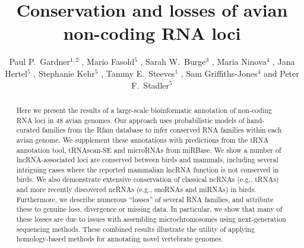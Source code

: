 \documentclass[10pt]{bmc_article}
\newenvironment{bmcformat}{\begin{raggedright}\baselineskip20pt\sloppy\setboolean{publ}{false}}{\end{raggedright}\baselineskip20pt\sloppy}
\begin{document}
\begin{bmcformat}

\title{Conservation and losses of avian non-coding RNA loci}

\author{
Paul P.\ Gardner\correspondingauthor$^{1,2}$
,
Mario Fasold$^5$
,
Sarah W.\ Burge$^3$
,
Maria Ninova$^4$
,
Jana Hertel$^5$
,
Stephanie Kehr$^5$
,
Tammy E.\ Steeves$^1$
,
Sam Griffiths-Jones$^4$
and
Peter F.\ Stadler\correspondingauthor$^5$
}
\address{
\iid(1) School of Biological Sciences, University of Canterbury, Private Bag 4800, Christchurch, New Zealand.
\iid(2) Biomolecular Interaction Centre, University of Canterbury, Private Bag 4800, Christchurch, New Zealand.
\iid(3) European Molecular Biology Laboratory, European Bioinformatics Institute, Hinxton, Cambridge, CB10 1SD, UK.
\iid(4) Faculty of Life Sciences, University of Manchester, Manchester, United Kingdom.
\iid(5) Bioinformatics Group, Department of Computer Science; and Interdisciplinary Center for Bioinformatics, University of Leipzig, H{\"a}rtelstrasse 16-18, D-04107 Leipzig, Germany
}

\maketitle

\begin{abstract}
Here we present the results of a large-scale bioinformatic annotation
of non-coding RNA loci in 48 avian genomes. Our approach uses
probabilistic models of hand-curated families from the Rfam database
to infer conserved RNA families within each avian genome. We
supplement these annotations with predictions from the tRNA annotation
tool, tRNAscan-SE and microRNAs from miRBase.  We show a number of
lncRNA-associated loci are conserved between birds and mammals,
including several intriguing cases where the reported mammalian lncRNA
function is not conserved in birds.  We also demonstrate extensive
conservation of classical ncRNAs (e.g., tRNAs) and more recently
discovered ncRNAs (e.g., snoRNAs and miRNAs) in birds. Furthermore, we
describe numerous ``losses'' of several RNA families, and attribute
these to genuine loss, divergence or missing data.  In particular, we
show that many of these losses are due to issues with assembling
microchromosomes using next-generation sequencing methods. These
combined results illustrate the utility of applying homology-based
methods for annotating novel vertebrate genomes.
\end{abstract}




\end{bmcformat}
\end{document}
